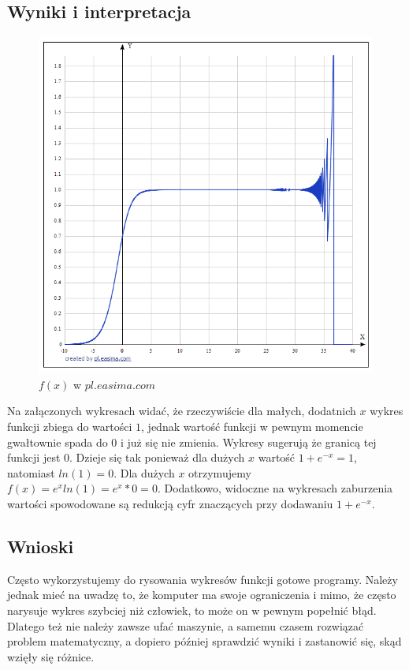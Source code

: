 \documentclass[8pt,letterpaper]{article}
\begin{document}
\subsection{Wyniki i interpretacja}

\begin{figure}[h!]
\includegraphics[width=\linewidth]{First_chart.png}
\caption{$f(x)$ w $pl.easima.com$}
\end{figure}

\pagebreak
\hspace{1 cm} Na załączonych wykresach widać, że rzeczywiście dla małych, dodatnich $x$ wykres funkcji zbiega do wartości $1$, jednak wartość funkcji w pewnym momencie gwałtownie spada do $0$ i już się nie zmienia. Wykresy sugerują że granicą tej funkcji jest $0$. Dzieje się tak ponieważ dla dużych $x$ wartość $1 + e ^{-x} = 1$, natomiast $ln(1) = 0$. Dla dużych $x$ otrzymujemy $f(x) = e^xln(1) = e^x*0 = 0$. Dodatkowo, widoczne na wykresach zaburzenia wartości spowodowane są redukcją cyfr znaczących przy dodawaniu $1 + e^{-x}$.

\subsection{Wnioski}
\hspace{1 cm}Często wykorzystujemy do rysowania wykresów funkcji gotowe programy. Należy jednak mieć na uwadzę to, że komputer ma swoje ograniczenia i mimo, że często narysuje wykres szybciej niż człowiek, to może on w pewnym popełnić błąd. Dlatego też nie należy zawsze ufać maszynie, a samemu czasem rozwiązać problem matematyczny, a dopiero później sprawdzić wyniki i zastanowić się, skąd wzięły się różnice.
\end{document}
